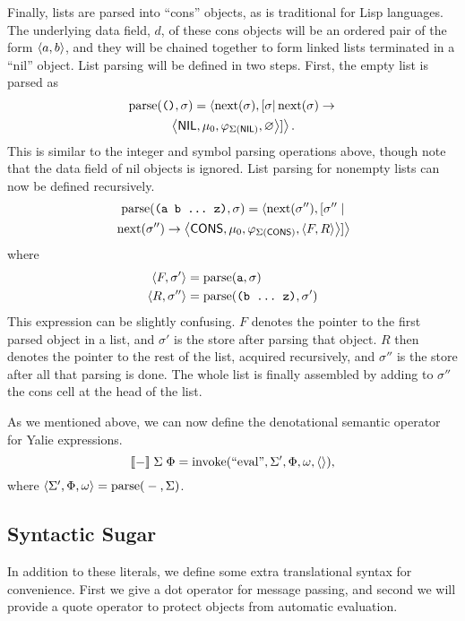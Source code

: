 \documentclass[twocolumn]{article}
\begin{document}
Finally, lists are parsed into ``cons'' objects, as is traditional for
Lisp languages. The underlying data field, $d$, of these cons objects
will be an ordered pair of the form $\left< a,b\right>$, and they will be
chained together to form linked lists terminated in a ``nil''
object. List parsing will be defined in two steps. First, the empty
list is parsed as
\begin{multline*}
  \operatorname{parse}(\texttt{()},\sigma) = \left<\operatorname{next}(\sigma),
  [\sigma|\operatorname{next}(\sigma) \rightarrow \right.\\
\left.\left<\mathsf{NIL}, \mu_0, \varphi_{\Sigma(\mathsf{NIL})}, \varnothing\right>]\right>.
\end{multline*}
This is similar to the integer and symbol parsing operations above,
though note that the data field of nil objects is ignored. List
parsing for nonempty lists can now be defined recursively.
\begin{multline*} \operatorname{parse}(\texttt{(a b \ldots\ z)},\sigma) = \left<
  \operatorname{next}(\sigma''),[\sigma'' \right. |\\\left.\operatorname{next}(\sigma'')
  \rightarrow\left<\mathsf{CONS}, \mu_0,
  \varphi_{\Sigma(\mathsf{CONS})},
  \left< F, R \right> \right> ] \right>
\end{multline*}
where
\begin{align*}
  \left< F, \sigma' \right> &= \operatorname{parse}( \texttt{a}, \sigma ) \\
  \left< R, \sigma'' \right> &= \operatorname{parse}( \texttt{(b \ldots\ z)}, \sigma')
\end{align*}
This expression can be slightly confusing. $F$ denotes the pointer to
the first parsed object in a list, and $\sigma'$ is the store after
parsing that object. $R$ then denotes the pointer to the rest of the
list, acquired recursively, and $\sigma''$ is the store after all that
parsing is done. The whole list is finally assembled by adding to
$\sigma''$ the cons cell at the head of the list.

As we mentioned above, we can now define the denotational semantic
operator for Yalie expressions.
\[ [\![-]\!]\phantom{,}\Sigma\phantom{,}\Phi = \operatorname{invoke}(\text{``eval''},
\Sigma', \Phi, \omega, \left<\right>),\] where $\left< \Sigma', \Phi, \omega\right>
= \operatorname{parse}({}-{},\Sigma)$.

\subsection*{Syntactic Sugar}
In addition to these literals, we define some extra translational
syntax for convenience. First we give a dot operator for message
passing, and second we will provide a quote operator to protect
objects from automatic evaluation.
\end{document}
